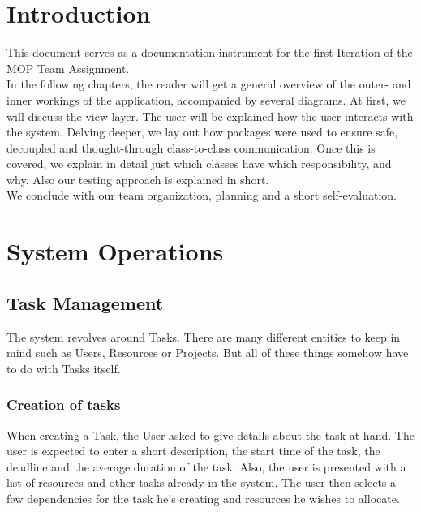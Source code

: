 



\maakvoorblad

\newpage
\thispagestyle{empty}
\mbox{}

\newpage
\maakvoorblad

\newpage

\tableofcontents

\newpage
\section{Introduction}
		This document serves as a documentation instrument for the first Iteration of the MOP Team Assignment.\\
		In the following chapters, the reader will get a general overview of the outer- and inner workings of the application, accompanied by several diagrams. At first, we will discuss the view layer. The user will be explained how the user interacts with the system. Delving deeper, we lay out how packages were used to ensure safe, decoupled and thought-through class-to-class communication.
		Once this is covered, we explain in detail just which classes have which responsibility, and why. Also our testing approach is explained in short.\\
		We conclude with our team organization, planning and a short self-evaluation.
	\section{System Operations}
		\subsection{Task Management}
			The system revolves around Tasks. There are many different entities to keep in mind such as Users, Resources or Projects.
			But all of these things somehow have to do with Tasks itself.
			\subsubsection{Creation of tasks}
				When creating a Task, the User asked to give details about the task at hand. The user is expected to enter a short description, the start time of the task, the deadline and the average duration of the task.
				Also, the user is presented with a list of resources and other tasks already in the system. The user then selects a few dependencies for the task he's creating and resources he wishes to allocate.

